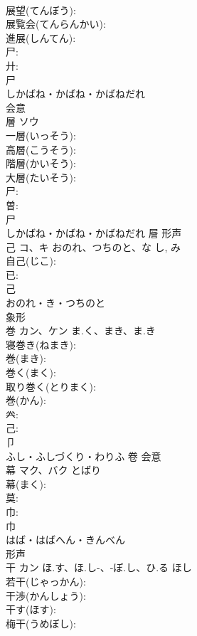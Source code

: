 \documentclass[8pt]{extreport}
\begin{document}
\begin{CJK}{UTF8}{min}
\\	展望(てんぼう): 
\\	展覧会(てんらんかい): 
\\	進展(しんてん): 
\\	尸: 
\\	廾: 
\\	尸	
\\	しかばね・かばね・かばねだれ	
\\	会意 
\\	層	ソウ			
\\	一層(いっそう): 
\\	高層(こうそう): 
\\	階層(かいそう): 
\\	大層(たいそう): 
\\	尸: 
\\	曽: 
\\	尸	
\\	しかばね・かばね・かばねだれ	層	形声 
\\	己	コ、キ	おのれ、つちのと、な	し, み	
\\	自己(じこ): 
\\	已: 
\\	己	
\\	おのれ・き・つちのと	
\\	象形 
\\	巻	カン、ケン	ま.く、まき、ま.き		
\\	寝巻き(ねまき): 
\\	巻(まき): 
\\	巻く(まく): 
\\	取り巻く(とりまく): 
\\	巻(かん): 
\\	𠔉: 
\\	己: 
\\	卩	
\\	ふし・ふしづくり・わりふ	卷	会意 
\\	幕	マク、バク	とばり		
\\	幕(まく): 
\\	莫: 
\\	巾: 
\\	巾	
\\	はば・はばへん・きんべん	
\\	形声 
\\	干	カン	ほ.す、ほ.し-、-ぼ.し、ひ.る	ほし	
\\	若干(じゃっかん): 
\\	干渉(かんしょう): 
\\	干す(ほす): 
\\	梅干(うめぼし): 

\end{CJK}
\end{document}
